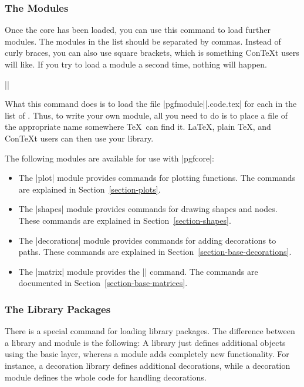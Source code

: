 \subsubsection{The Modules}

\begin{command}{\usepgflibrary{}}
  Once the core has been loaded, you can use this command to load
  further modules. The modules in the  list should
  be separated by commas. Instead of curly braces, you can also
  use square brackets, which is something Con\TeX t users will
  like. If you try to load a module a second time, nothing will
  happen.

  \example ||

  What this command does is to load the file
  |pgfmodule||.code.tex| for each  in
  the list of . Thus, to write your own module,
  all you need to do is to place a file of the appropriate name
  somewhere \TeX\ can find it. \LaTeX, plain \TeX, and Con\TeX t
  users can then use your library.
\end{command}

The following modules are available for use with |pgfcore|:

\begin{itemize}
\item The |plot| module provides commands for plotting functions.  The
  commands are explained in Section~\ref{section-plots}.
\item The |shapes| module provides commands for drawing shapes and
  nodes. These commands are explained in
  Section~\ref{section-shapes}.
\item The |decorations| module provides commands for adding
  decorations to paths. These commands are explained in
  Section~\ref{section-base-decorations}.
\item The |matrix| module provides the |\pgfmatrix| command. The
  commands are documented in Section~\ref{section-base-matrices}.
\end{itemize}



\subsubsection{The Library Packages}

There is a special command for loading library packages. The
difference between a library and module is the following: A library
just defines additional objects using the basic layer, whereas a
module adds completely new functionality. For instance, a decoration
library defines additional decorations, while a decoration module
defines the whole code for handling decorations.

